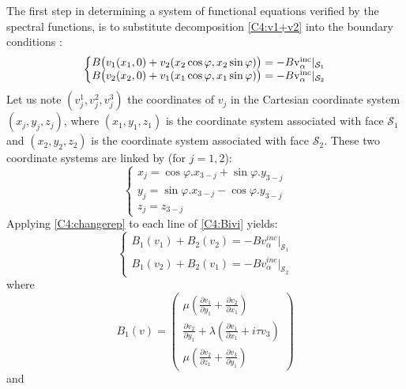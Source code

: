 The first step in determining a system of functional equations verified by the spectral functions, is to substitute decomposition \eqref{C4:v1+v2} into the boundary conditions :
\begin{equation}
\left\{
\begin{matrix}
B \big( v_1(x_1,0)+v_2(x_2 \cos \varphi, x_2 \sin \varphi) \big) = -B \rm v_{\alpha}^{inc}|_{\mathcal{S}_1} \\
B \big( v_2(x_2,0)+v_1(x_1 \cos \varphi, x_1 \sin \varphi) \big) = -B \rm v_{\alpha}^{inc}|_{\mathcal{S}_2}
\end{matrix}
\right.
\label{C4:Bivi}
\end{equation}
Let us note $(v_j^1,v_j^2,v_j^3)$ the coordinates of $v_j$ in the Cartesian coordinate system $(x_j,y_j,z_j)$, where $(x_1,y_1,z_1)$ is the coordinate system associated with face $\mathcal{S}_1$ and $(x_2,y_2,z_2)$ is the coordinate system associated with face $\mathcal{S}_2$. These two coordinate systems are linked by (for $j=1,2$):
\begin{equation}
    \left\{
    \begin{matrix}
    x_j=\cos\varphi .x_{3-j}+\sin\varphi. y_{3-j}\\
    y_j=\sin\varphi .x_{3-j}-\cos\varphi .y_{3-j}\\
    z_j=z_{3-j}
    \end{matrix}
    \right.
    \label{C4:changerep}
\end{equation}
Applying \eqref{C4:changerep} to each line of \eqref{C4:Bivi} yields: 
\begin{equation}
\left\{
\begin{matrix}
B_1(v_1)+B_2(v_2)=-Bv_{\alpha}^{inc}|_{\mathcal{S}_1} \\
B_1(v_2)+B_2(v_1)=-Bv_{\alpha}^{inc}|_{\mathcal{S}_2}
\end{matrix}
\right.
\label{C4:b1v1+b2v2}
\end{equation}
where
\begin{equation}
B_1(v)=
\begin{pmatrix}
\mu \left( \frac{\partial v_1}{\partial y_1}+\frac{\partial v_2}{\partial x_1} \right) \\
\frac{\partial v_2}{\partial y_1}+\lambda \left( \frac{\partial v_1}{\partial x_1}+i\tau v_3 \right)\\
\mu \left( \frac{\partial v_2}{\partial z_1}+ \frac{\partial v_3}{\partial y_1}\right)
\end{pmatrix}
\label{C4:B1v1expl}
\end{equation}
and
